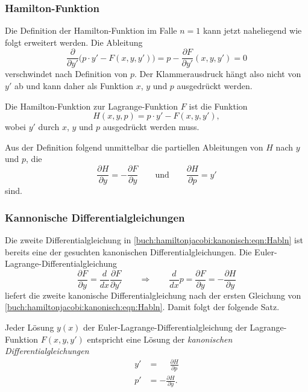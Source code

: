 %
%
\subsubsection{Hamilton-Funktion}
Die Definition der Hamilton-Funktion im Falle $n=1$ kann jetzt
naheliegend wie folgt erweitert werden.
Die Ableitung
\begin{equation*}
\frac{\partial}{\partial y'}
\bigl(
p\cdot y'
-
F(x,y,y')
\bigr)
=
p
-
\frac{\partial F}{\partial y'}(x,y,y')
=
0
\end{equation*}
verschwindet nach Definition von $p$.
Der Klammerausdruck hängt also nicht von $y'$ ab und kann daher 
als Funktion $x$, $y$ und $p$ ausgedrückt werden.

\begin{definition}
Die Hamilton-Funktion zur Lagrange-Funktion $F$ ist die Funktion
\[
H(x,y,p)
=
p\cdot y' - F(x,y,y'),
\]
wobei $y'$ durch $x$, $y$ und $p$ ausgedrückt werden muss.
\end{definition}

Aus der Definition folgend unmittelbar die partiellen Ableitungen
von $H$ nach $y$ und $p$, die
\begin{equation}
\frac{\partial H}{\partial y}
=
-\frac{\partial F}{\partial y}
\qquad\text{und}\qquad
\frac{\partial H}{\partial p}
=
y'
\label{buch:hamiltonjacobi:kanonisch:eqn:Habln}
\end{equation}
sind.

%
%
\subsubsection{Kannonische Differentialgleichungen}
Die zweite Differentialgleichung in
\eqref{buch:hamiltonjacobi:kanonisch:eqn:Habln}
ist bereits eine der gesuchten kanonischen Differentialgleichungen.
Die Euler-Lagrange-Differentialgleichung
\[
\frac{\partial F}{\partial y}=
\frac{d}{dx}\frac{\partial F}{\partial y'}
\qquad\Rightarrow\qquad
\frac{d}{dx}p
=
\frac{\partial F}{\partial y}
=
-\frac{\partial H}{\partial y}
\]
liefert die zweite kanonische Differentialgleichung nach der
ersten Gleichung von \eqref{buch:hamiltonjacobi:kanonisch:eqn:Habln}.
Damit folgt der folgende Satz.

\begin{satz}
\label{buch:hamiltonjacobi:kanonisch:satz:kandgln}
Jeder Lösung $y(x)$ der Euler-Lagrange-Differentialgleichung der
Lagrange-Funktion $F(x,y,y')$ entspricht eine Lösung
der {\em kanonischen Differentialgleichungen}
%
\begin{equation}
\begin{aligned}
y'&=\phantom{-}\frac{\partial H}{\partial p}
\\
p'&=-\frac{\partial H}{\partial y}.
\end{aligned}
\end{equation}
\end{satz}

